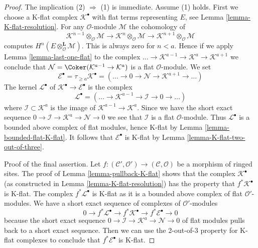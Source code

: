 \begin{proof}
The implication (2) $\Rightarrow$ (1) is immediate. Assume (1) holds.
First we choose a K-flat complex $\mathcal{K}^\bullet$
with flat terms representing $E$, see Lemma \ref{lemma-K-flat-resolution}.
For any $\mathcal{O}$-module $\mathcal{M}$ the cohomology of
$$
\mathcal{K}^{n - 1} \otimes_\mathcal{O} \mathcal{M} \to
\mathcal{K}^n \otimes_\mathcal{O} \mathcal{M} \to
\mathcal{K}^{n + 1} \otimes_\mathcal{O} \mathcal{M}
$$
computes $H^n(E \otimes_\mathcal{O}^\mathbf{L} \mathcal{M})$.
This is always zero for $n < a$. Hence if we apply
Lemma \ref{lemma-last-one-flat} to the complex
$\ldots \to \mathcal{K}^{a - 1} \to \mathcal{K}^a \to \mathcal{K}^{a + 1}$
we conclude that $\mathcal{N} = \Coker(\mathcal{K}^{a - 1} \to \mathcal{K}^a)$
is a flat $\mathcal{O}$-module. We set
$$
\mathcal{E}^\bullet = \tau_{\geq a}\mathcal{K}^\bullet =
(\ldots \to 0 \to \mathcal{N} \to \mathcal{K}^{a + 1} \to \ldots )
$$
The kernel $\mathcal{L}^\bullet$ of
$\mathcal{K}^\bullet \to \mathcal{E}^\bullet$ is the complex
$$
\mathcal{L}^\bullet = (\ldots \to \mathcal{K}^{a - 1} \to
\mathcal{I} \to 0 \to \ldots)
$$
where $\mathcal{I} \subset \mathcal{K}^a$ is the image of
$\mathcal{K}^{a - 1} \to \mathcal{K}^a$.
Since we have the short exact sequence
$0 \to \mathcal{I} \to \mathcal{K}^a \to \mathcal{N} \to 0$
we see that $\mathcal{I}$ is a flat $\mathcal{O}$-module.
Thus $\mathcal{L}^\bullet$ is a bounded
above complex of flat modules, hence K-flat by
Lemma \ref{lemma-bounded-flat-K-flat}.
It follows that $\mathcal{E}^\bullet$ is K-flat by
Lemma \ref{lemma-K-flat-two-out-of-three}.

\medskip\noindent
Proof of the final assertion. Let
$f : (\mathcal{C}', \mathcal{O}') \to (\mathcal{C}, \mathcal{O})$
be a morphism of ringed sites. The proof of
Lemma \ref{lemma-pullback-K-flat} shows that the complex
$\mathcal{K}^\bullet$ (as constructed in Lemma \ref{lemma-K-flat-resolution})
has the property that $f^*\mathcal{K}^\bullet$ is K-flat.
The complex $f^*\mathcal{L}^\bullet$ is K-flat as it is a bounded
above complex of flat $\mathcal{O}'$-modules. We have a short exact
sequence of complexes of $\mathcal{O}'$-modules
$$
0 \to f^*\mathcal{L}^\bullet \to f^*\mathcal{K}^\bullet \to
f^*\mathcal{E}^\bullet \to 0
$$
because the short exact sequence
$0 \to \mathcal{I} \to \mathcal{K}^a \to \mathcal{N} \to 0$
of flat modules pulls back to a short exact sequence.
Then we can use the 2-out-of-3 property for K-flat
complexes to conclude that $f^*\mathcal{E}^\bullet$ is K-flat.
\end{proof}

